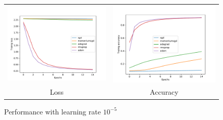 \documentclass[12pt]{article}
\newcommand{\nnperfw}{7cm}
\begin{document}
\begin{figure}
\centering
\begin{tabular}{cc}
  \includegraphics[width=\nnperfw]{hw2/codes/optimizer/pytorch/results/1e-5/loss.pdf} &   \includegraphics[width=\nnperfw]{hw2/codes/optimizer/pytorch/results/1e-5/accuracy.pdf} \\
Loss & Accuracy \\[6pt]
\end{tabular}
\caption{Performance with learning rate $10^{-5}$} \label{fig:nn-1e-5}
\end{figure}
\end{document}
